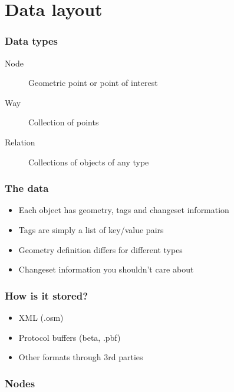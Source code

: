 \documentclass[14pt]{beamer}
\begin{document}
\section{Data layout}
\label{sec:diving}

\begin{frame}
  \frametitle{Data types}
  \begin{description}
  \item[Node] Geometric point or point of interest
  \item[Way] Collection of points
  \item[Relation] Collections of objects of any type
  \end{description}
\end{frame}

\begin{frame}
  \frametitle{The data}
  \begin{itemize}
  \item Each object has geometry, tags and changeset information
  \item Tags are simply a list of key/value pairs
  \item Geometry definition differs for different types
  \item Changeset information you shouldn't care about
  \end{itemize}
\end{frame}

\begin{frame}
  \frametitle{How is it stored?}
  \begin{itemize}
  \item XML (.osm)
  \item Protocol buffers (beta, .pbf)
  \item Other formats through 3rd parties
  \end{itemize}
\end{frame}

\begin{frame}
  \frametitle{Nodes}
\end{frame}

\begin{frame}
\end{frame}
\end{document}
